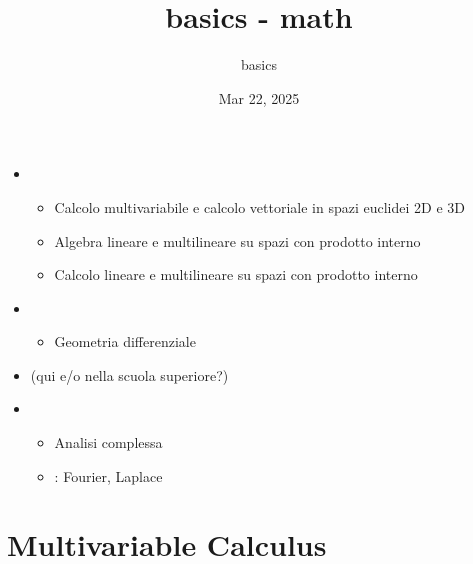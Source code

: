 \documentclass[letterpaper,10pt,english]{jupyterBook}
\title{basics - math}
\date{Mar 22, 2025}
\author{basics}
\begin{document}
\pagestyle{empty}
\sphinxmaketitle
\pagestyle{plain}
\sphinxtableofcontents
\pagestyle{normal}
\label{\detokenize{intro::doc}}


\sphinxAtStartPar
{}
\begin{itemize}
\item {} 
\sphinxAtStartPar
{}
\begin{itemize}
\item {} 
\sphinxAtStartPar
Calcolo multivariabile e calcolo vettoriale in spazi euclidei 2D e 3D

\item {} 
\sphinxAtStartPar
Algebra lineare e multilineare su spazi con prodotto interno

\item {} 
\sphinxAtStartPar
Calcolo lineare e multilineare su spazi con prodotto interno

\end{itemize}

\item {} 
\sphinxAtStartPar
{}
\begin{itemize}
\item {} 
\sphinxAtStartPar
Geometria differenziale

\end{itemize}

\item {} 
\sphinxAtStartPar
{} (qui e/o nella scuola superiore?)

\item {} 
\sphinxAtStartPar
{}
\begin{itemize}
\item {} 
\sphinxAtStartPar
Analisi complessa

\item {} 
\sphinxAtStartPar
{}: Fourier, Laplace

\end{itemize}

\end{itemize}

\sphinxstepscope


\part{Multivariable Calculus}

\sphinxstepscope
\end{document}
